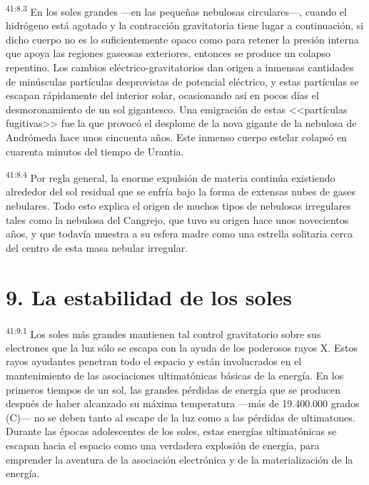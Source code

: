 \par
\textsuperscript{41:8.3} En los soles grandes ---en las pequeñas nebulosas circulares---, cuando el hidrógeno está agotado y la contracción gravitatoria tiene lugar a continuación, si dicho cuerpo no es lo suficientemente opaco como para retener la presión interna que apoya las regiones gaseosas exteriores, entonces se produce un colapso repentino. Los cambios eléctrico-gravitatorios dan origen a inmensas cantidades de minúsculas partículas desprovistas de potencial eléctrico, y estas partículas se escapan rápidamente del interior solar, ocasionando así en pocos días el desmoronamiento de un sol gigantesco. Una emigración de estas <<partículas fugitivas>> fue la que provocó el desplome de la nova gigante de la nebulosa de Andrómeda hace unos cincuenta años. Este inmenso cuerpo estelar colapsó en cuarenta minutos del tiempo de Urantia.

\par
\textsuperscript{41:8.4} Por regla general, la enorme expulsión de materia continúa existiendo alrededor del sol residual que se enfría bajo la forma de extensas nubes de gases nebulares. Todo esto explica el origen de muchos tipos de nebulosas irregulares tales como la nebulosa del Cangrejo, que tuvo su origen hace unos novecientos años, y que todavía muestra a su esfera madre como una estrella solitaria cerca del centro de esta masa nebular irregular.

\section*{9. La estabilidad de los soles}
\par
\textsuperscript{41:9.1} Los soles más grandes mantienen tal control gravitatorio sobre sus electrones que la luz sólo se escapa con la ayuda de los poderosos rayos X. Estos rayos ayudantes penetran todo el espacio y están involucrados en el mantenimiento de las asociaciones ultimatónicas básicas de la energía. En los primeros tiempos de un sol, las grandes pérdidas de energía que se producen después de haber alcanzado su máxima temperatura ---más de 19.400.000 grados (C)--- no se deben tanto al escape de la luz como a las pérdidas de ultimatones. Durante las épocas adolescentes de los soles, estas energías ultimatónicas se escapan hacia el espacio como una verdadera explosión de energía, para emprender la aventura de la asociación electrónica y de la materialización de la energía.

